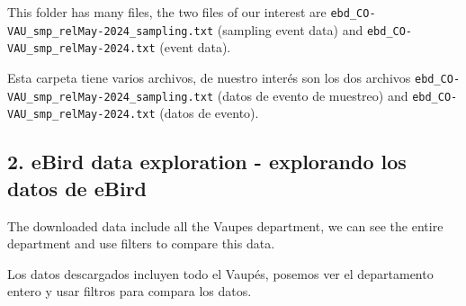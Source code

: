 \documentclass[
]{article}
\begin{document}
This folder has many files, the two files of our interest are
\texttt{ebd\_CO-VAU\_smp\_relMay-2024\_sampling.txt} (sampling event
data) and \texttt{ebd\_CO-VAU\_smp\_relMay-2024.txt} (event data).

Esta carpeta tiene varios archivos, de nuestro interés son los dos
archivos \texttt{ebd\_CO-VAU\_smp\_relMay-2024\_sampling.txt} (datos de
evento de muestreo) and \texttt{ebd\_CO-VAU\_smp\_relMay-2024.txt}
(datos de evento).

\hypertarget{ebird-data-exploration---explorando-los-datos-de-ebird}{%
\subsection{2. eBird data exploration - explorando los datos de
eBird}\label{ebird-data-exploration---explorando-los-datos-de-ebird}}

The downloaded data include all the Vaupes department, we can see the
entire department and use filters to compare this data.

Los datos descargados incluyen todo el Vaupés, posemos ver el
departamento entero y usar filtros para compara los datos.
\end{document}
